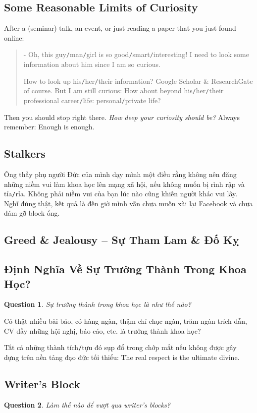 \documentclass{article}
\numberwithin{equation}{section}
\newtheorem{ques}{Question}[section]
\begin{document}
\subsection{Some Reasonable Limits of Curiosity}
After a (seminar) talk, an event, or just reading a paper that you just found online:
\begin{quotation}
	- Oh, this guy\texttt{/}man\texttt{/}girl is so good\texttt{/}smart\texttt{/}interesting! I need to look some information about him since I am so curious.
	
	How to look up his\texttt{/}her\texttt{/}their information? Google Scholar \& ResearchGate of course. But I am still curious: How about beyond his\texttt{/}her\texttt{/}their professional career\texttt{/}life: personal\texttt{/}private life?
\end{quotation}
Then you should stop right there. \textit{How deep your curiosity should be?} Always remember: Enough is enough.

\subsection{Stalkers}
Ông thầy phụ người Đức của mình dạy mình một điều rằng không nên đăng những niềm vui làm khoa học lên mạng xã hội, nếu không muốn bị rình rập và tỉa\texttt{/}rỉa. Không phải niềm vui của bạn lúc nào cũng khiến người khác vui lây. Nghĩ đúng thật, kết quả là đến giờ mình vẫn chưa muốn xài lại Facebook và chưa dám gỡ block ổng.

\subsection{Greed \& Jealousy -- Sự Tham Lam \& Đố Kỵ}

\subsection{Định Nghĩa Về Sự Trưởng Thành Trong Khoa Học?}
\begin{ques}
	Sự trưởng thành trong khoa học là như thế nào?
\end{ques}
Có thật nhiều bài báo, có hàng ngàn, thậm chí chục ngàn, trăm ngàn trích dẫn, CV đầy những hội nghị, báo cáo, etc. là trưởng thành khoa học?

Tất cả những thành tích\texttt{/}tựu đó sụp đổ trong chớp mắt nếu không được gây dựng trên nền tảng đạo đức tối thiểu: The real respect is the ultimate divine.

\subsection{Writer's Block}
\begin{ques}
	Làm thế nào để vượt qua writer's blocks?
\end{ques}
\end{document}
